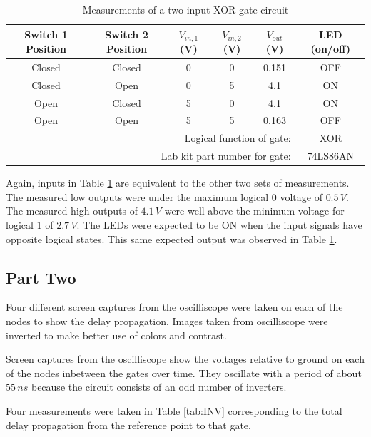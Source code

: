 \documentclass[CMPE]{KGCOEReport}
\begin{document}
\begin{table}[h]
\renewcommand{\arraystretch}{1.2}
\caption{Measurements of a two input XOR gate circuit}
\begin{center}
\begin{tabular}{|c|c|c|c|c|c|}
\hline
Switch 1 Position & Switch 2 Position & $V_{in,1}$ (V) & $V_{in,2}$ (V) & $V_{out}$ (V) & LED (on/off)\\\hline

Closed & Closed & 0 & 0 & 0.151 & OFF \\\hline
Closed & Open   & 0 & 5 & 4.1   & ON \\\hline
Open   & Closed & 5 & 0 & 4.1   & ON \\\hline
Open   & Open   & 5 & 5 & 0.163 & OFF \\\hline
\multicolumn{5}{|r|}{Logical function of gate: } & XOR  \\\hline
\multicolumn{5}{|r|}{Lab kit part number for gate: } & 74LS86AN  \\\hline

\end{tabular}
\end{center}
\label{tab:XOR}
\end{table}

Again, inputs in Table \ref{tab:XOR} are equivalent to the other two sets of measurements. The measured low outputs were under the maximum logical 0 voltage of $0.5\,V$. The measured high outputs of $4.1\,V$ were well above the minimum voltage for logical 1 of $2.7\,V$. The LEDs were expected to be ON when the input signals have opposite logical states. This same expected output was observed in Table \ref{tab:XOR}.


\subsection*{Part Two}

Four different screen captures from the oscilliscope were taken on each of the nodes to show the delay propagation. Images taken from oscilliscope were inverted to make better use of colors and contrast.


Screen captures from the oscilliscope show the voltages relative to ground on each of the nodes inbetween the gates over time. They oscillate with a period of about $55\,ns$ because the circuit consists of an odd number of inverters.\par


Four measurements were taken in Table \ref{tab:INV} corresponding to the total delay propagation from the reference point to that gate.
\end{document}

